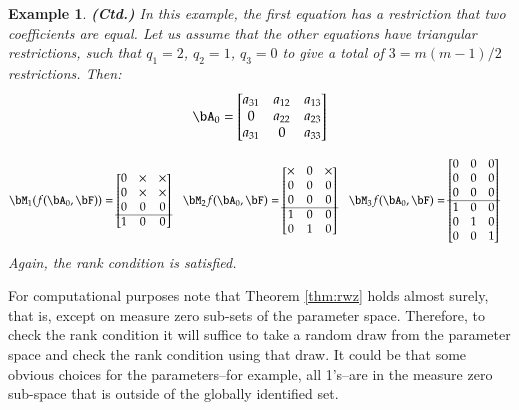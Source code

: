 \documentclass [12pt]{article}
\newtheorem{example}{Example}
\begin{document}
    \setcounter{example}{1}    
    \begin{example}{\textbf{(Ctd.)}}
        In this example, the first equation has a restriction that two coefficients are equal. Let us assume that the other equations have triangular restrictions, such that $q_1 = 2$, $q_2 = 1$, $q_3 = 0$ to give a total of $3 = m(m-1)/2$ restrictions. Then:
        \begin{equation*}
            \bA_0 = \begin{bmatrix}
                      a_{31} & a_{12} & a_{13} \\
                      0 & a_{22} & a_{23} \\
                      a_{31} & 0 & a_{33}
                    \end{bmatrix}
        \end{equation*}
        
        \begin{align*}
           \bM_1( f( \bA_0, \bF ) ) &= \begin{bmatrix} 0 & \times & \times \\ 0 & \times & \times \\ 0 & 0 & 0 \\ \hline 1 & 0 & 0 \end{bmatrix}
           &
           \bM_2 f( \bA_0, \bF ) &= \begin{bmatrix} \times & 0 & \times \\ 0 & 0 & 0 \\ 0 & 0 & 0 \\ \hline 1 & 0 & 0 \\ 0 & 1 & 0 \end{bmatrix}
           &
           \bM_3 f( \bA_0, \bF ) &= \begin{bmatrix} 0 & 0 & 0 \\ 0 & 0 & 0 \\ 0 & 0 & 0 \\ \hline 1 & 0 & 0 \\ 0 & 1 & 0 \\ 0 & 0 & 1 \end{bmatrix}
        \end{align*}
        Again, the rank condition is satisfied.
    \end{example}
    
    
    For computational purposes note that Theorem \ref{thm:rwz} holds almost surely, that is, except on measure zero sub-sets of the parameter space. Therefore, to check the rank condition it will suffice to take a random draw from the parameter space and check the rank condition using that draw. It could be that some obvious choices for the parameters--for example, all 1's--are in the measure zero sub-space that is outside of the globally identified set.
    

    
    

    \bigskip{}
\end{document}
